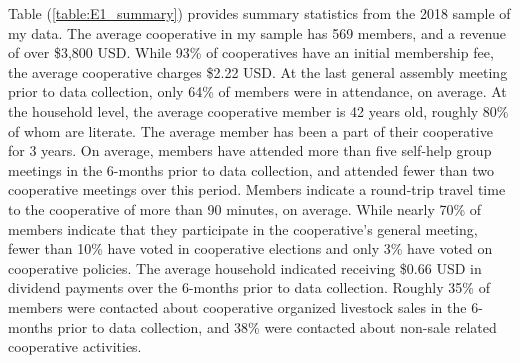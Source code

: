 \documentclass[11pt]{article}
\begin{document}
Table (\ref{table:E1_summary}) provides summary statistics from the 2018 sample of my data. The average cooperative in my sample has 569 members, and a revenue of over \$3,800 USD. While 93\% of cooperatives have an initial membership fee, the average cooperative charges \$2.22 USD. At the last general assembly meeting prior to data collection, only 64\% of members were in attendance, on average. At the household level, the average cooperative member is 42 years old, roughly 80\% of whom are literate. The average member has been a part of their cooperative for 3 years. On average, members have attended more than five self-help group meetings in the 6-months prior to data collection, and attended fewer than two cooperative meetings over this period. Members indicate a round-trip travel time to the cooperative of more than 90 minutes, on average. While nearly 70\% of members indicate that they participate in the cooperative's general meeting, fewer than 10\% have voted in cooperative elections and only 3\% have voted on cooperative policies. The average household indicated receiving \$0.66 USD in dividend payments over the 6-months prior to data collection. Roughly 35\% of members were contacted about cooperative organized livestock sales in the 6-months prior to data collection, and 38\% were contacted about non-sale related cooperative activities. 
\end{document}
